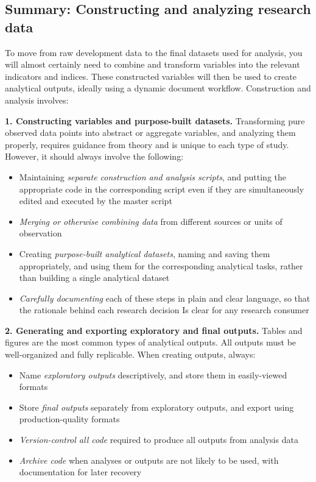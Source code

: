 \documentclass[
]{book}
\providecommand{\tightlist}{%
  \setlength{\itemsep}{0pt}\setlength{\parskip}{0pt}}
\begin{document}
\begin{summary}
\hypertarget{summary-constructing-and-analyzing-research-data}{%
\subsection*{Summary: Constructing and analyzing research data}\label{summary-constructing-and-analyzing-research-data}}

To move from raw development data to the final datasets used for analysis, you will almost certainly need to combine and transform variables into the relevant indicators and indices. These constructed variables will then be used to create analytical outputs, ideally using a dynamic document workflow. Construction and analysis involves:

\textbf{1. Constructing variables and purpose-built datasets.} Transforming pure observed data points into abstract or aggregate variables, and analyzing them properly, requires guidance from theory and is unique to each type of study. However, it should always involve the following:

\begin{itemize}
\tightlist
\item
  Maintaining \emph{separate construction and analysis scripts}, and putting the appropriate code in the corresponding script even if they are simultaneously edited and executed by the master script
\item
  \emph{Merging or otherwise combining data} from different sources or units of observation
\item
  Creating \emph{purpose-built analytical datasets}, naming and saving them appropriately, and using them for the corresponding analytical tasks, rather than building a single analytical dataset
\item
  \emph{Carefully documenting} each of these steps in plain and clear language, so that the rationale behind each research decision Is clear for any research consumer
\end{itemize}

\textbf{2. Generating and exporting exploratory and final outputs.} Tables and figures are the most common types of analytical outputs. All outputs must be well-organized and fully replicable. When creating outputs, always:

\begin{itemize}
\tightlist
\item
  Name \emph{exploratory outputs} descriptively, and store them in easily-viewed formats
\item
  Store \emph{final outputs} separately from exploratory outputs, and export using production-quality formats
\item
  \emph{Version-control all code} required to produce all outputs from analysis data
\item
  \emph{Archive code} when analyses or outputs are not likely to be used, with documentation for later recovery
\end{itemize}


\end{summary}
\end{document}
